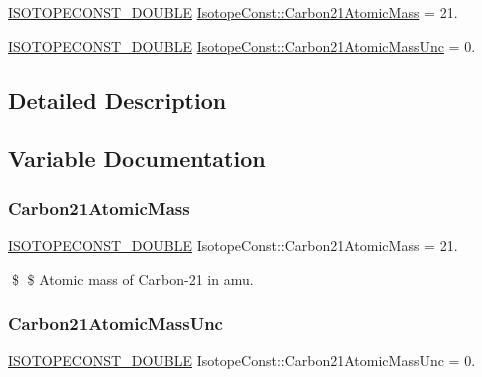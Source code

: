 \begin{DoxyCompactItemize}
\item 
\mbox{\hyperlink{group___isotope_const-_macros_ga8f45a7272ce02c0b4c65c44636ed719a}{I\+S\+O\+T\+O\+P\+E\+C\+O\+N\+S\+T\+\_\+\+D\+O\+U\+B\+LE}} \mbox{\hyperlink{group___isotope_const-_carbon-_c21_ga92260d858ab8155e22b224c9bdfabaec}{Isotope\+Const\+::\+Carbon21\+Atomic\+Mass}} = 21.
\item 
\mbox{\hyperlink{group___isotope_const-_macros_ga8f45a7272ce02c0b4c65c44636ed719a}{I\+S\+O\+T\+O\+P\+E\+C\+O\+N\+S\+T\+\_\+\+D\+O\+U\+B\+LE}} \mbox{\hyperlink{group___isotope_const-_carbon-_c21_gae8e3840497a27f62f5d3f08f8e760b7b}{Isotope\+Const\+::\+Carbon21\+Atomic\+Mass\+Unc}} = 0.
\end{DoxyCompactItemize}


\subsection{Detailed Description}


\subsection{Variable Documentation}
\mbox{\label{group___isotope_const-_carbon-_c21_ga92260d858ab8155e22b224c9bdfabaec}} 
\subsubsection{\texorpdfstring{Carbon21\+Atomic\+Mass}{Carbon21AtomicMass}}
{\footnotesize\ttfamily \mbox{\hyperlink{group___isotope_const-_macros_ga8f45a7272ce02c0b4c65c44636ed719a}{I\+S\+O\+T\+O\+P\+E\+C\+O\+N\+S\+T\+\_\+\+D\+O\+U\+B\+LE}} Isotope\+Const\+::\+Carbon21\+Atomic\+Mass = 21.}

\$ \$ Atomic mass of Carbon-\/21 in amu. \mbox{\label{group___isotope_const-_carbon-_c21_gae8e3840497a27f62f5d3f08f8e760b7b}} 
\subsubsection{\texorpdfstring{Carbon21\+Atomic\+Mass\+Unc}{Carbon21AtomicMassUnc}}
{\footnotesize\ttfamily \mbox{\hyperlink{group___isotope_const-_macros_ga8f45a7272ce02c0b4c65c44636ed719a}{I\+S\+O\+T\+O\+P\+E\+C\+O\+N\+S\+T\+\_\+\+D\+O\+U\+B\+LE}} Isotope\+Const\+::\+Carbon21\+Atomic\+Mass\+Unc = 0.}

